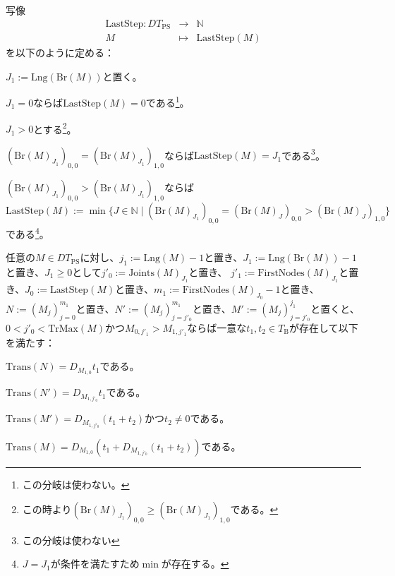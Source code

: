 \documentclass[dvipdfmx,uplatex]{jsarticle}
\theoremstyle{customnonumberbreakfortheorem}
\theoremstyle{customnonumberbreakforproof}
\begin{document}
写像
\begin{eqnarray*}
\textrm{LastStep} \colon DT_{\textrm{PS}} & \to & \mathbb{N} \\
M & \mapsto & \textrm{LastStep}(M)
\end{eqnarray*}
を以下のように定める：
\begin{nenumerate}
	\item \(J_1 := \textrm{Lng}(\textrm{Br}(M))\)と置く。
	\item \(J_1 = 0\)ならば\(\textrm{LastStep}(M) = 0\)である\footnote{この分岐は使わない。}。
	\item \(J_1 > 0\)とする\footnote{この時より\((\textrm{Br}(M)_{J_1})_{0,0} \geq (\textrm{Br}(M)_{J_1})_{1,0}\)である。}。
	\begin{nenumerate}
		\item \((\textrm{Br}(M)_{J_1})_{0,0} = (\textrm{Br}(M)_{J_1})_{1,0}\)ならば\(\textrm{LastStep}(M) = J_1\)である\footnote{この分岐は使わない}。
		\item \((\textrm{Br}(M)_{J_1})_{0,0} > (\textrm{Br}(M)_{J_1})_{1,0}\)ならば\(\textrm{LastStep}(M) := \min \{J \in \mathbb{N} \mid (\textrm{Br}(M)_{J_1})_{0,0} = (\textrm{Br}(M)_J)_{0,0} > (\textrm{Br}(M)_J)_{1,0}\}\)である\footnote{\(J = J_1\)が条件を満たすため\(\min\)が存在する。}。
	\end{nenumerate}
\end{nenumerate}

\begin{proposition}\label{条件(II)か(IV)の下での終切片とTransの関係}
	任意の\(M \in DT_{\textrm{PS}}\)に対し、\(j_1 := \textrm{Lng}(M)-1\)と置き、\(J_1 := \textrm{Lng}(\textrm{Br}(M))-1\)と置き、\(J_1 \geq 0\)として\(j'_0 := \textrm{Joints}(M)_{J_1}\)と置き、 \(j'_1 := \textrm{FirstNodes}(M)_{J_1}\)と置き、\(J_0 := \textrm{LastStep}(M)\)と置き、\(m_1 := \textrm{FirstNodes}(M)_{J_0}-1\)と置き、\(N := (M_j)_{j=0}^{m_1}\)と置き、\(N' := (M_j)_{j=j'_0}^{m_1}\)と置き\footnotemark{}、\(M' := (M_j)_{j=j'_0}^{j_1}\)と置くと、\(0 < j'_0 < \textrm{TrMax}(M)\)かつ\(M_{0,j'_1} > M_{1,j'_1}\)ならば一意な\(t_1,t_2 \in T_{\textrm{B}}\)が存在して以下を満たす：
	\begin{penumerate}
		\item \(\textrm{Trans}(N) = D_{M_{1,0}} t_1\)である。
		\item \(\textrm{Trans}(N') = D_{M_{1,j'_0}} t_1\)である。
		\item \(\textrm{Trans}(M') = D_{M_{1,j'_0}}(t_1 + t_2)\)かつ\(t_2 \neq 0\)である。
		\item \(\textrm{Trans}(M) = D_{M_{1,0}}(t_1 + D_{M_{1,j'_0}}(t_1 + t_2))\)である。
	\end{penumerate}
\end{proposition}
\end{document}
